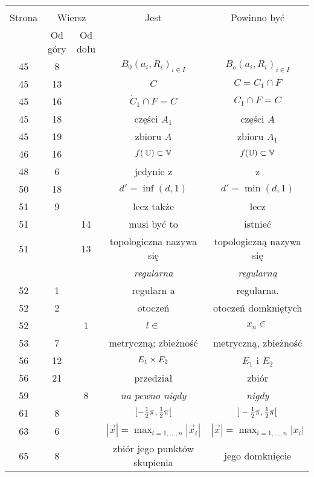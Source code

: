 \documentclass[a4paper,11pt]{article}
\newcommand{\V}{\mb{V}}
\newcommand{\U}{\mb{U}}
\begin{document}
\begin{center}
  \begin{tabular}{|c|c|c|c|c|}
    \hline
    & \multicolumn{2}{c|}{} & & \\
    Strona & \multicolumn{2}{c|}{Wiersz} & Jest
                              & Powinno być \\ \cline{2-3}
    & Od góry & Od dołu & & \\
    \hline
    45  &  8 & & $B_{ 0 }( a_{ i }, R_{ i } )_{ i \in I }$
           & $B_{ o }( a_{ i }, R_{ i } )_{ i \in I }$ \\
    45  & 13 & & $C$ & $C = C_{ 1 } \cap F$ \\
    45  & 16 & & $\dot{ C }_{ 1 } \cap F = C$ & $C_{ 1 } \cap F = C$ \\
    45  & 18 & & części $A_{ 1 }$ & części $A$ \\
    45  & 19 & & zbioru $A$ & zbioru $A_{ 1 }$ \\
    46  & 16 & & $f( \: \U ) \subset \V$ & $f( \U ) \subset \V$ \\
    48  &  6 & & jedynie z & z \\
    50  & 18 & & $d' = \inf( d, 1 )$ & $d' = \min( d, 1 )$ \\
    51  &  9 & & lecz także & lecz \\
    51  & & 14 & musi być to & istnieć \\
    51  & & 13 & topologiczna nazywa się & topologiczną nazywa się \\
    & & & \emph{regularna} & \emph{regularną} \\  %
    52  &  1 & & regularn a & regularna. \\
    52  &  2 & & otoczeń & otoczeń domkniętych \\
    52  & &  1 & $l \in$ & $x_{ n } \in$ \\
    53  &  7 & & metryczną; zbieżność & metryczną, zbieżność \\
    56  & 12 & & $E_{ 1 } \times E_{ 2 }$ & $E_{ 1 }$ i $E_{ 2 }$ \\
    56  & 21 & & przedział & zbiór \\
    59  & &  8 & \emph{na pewno nigdy} & \emph{nigdy} \\
    61  &  8 & & $[ -\frac{ 1 }{ 2 } \pi, \frac{ 1 }{ 2 } \pi [$
           & $] -\frac{ 1 }{ 2 } \pi, \frac{ 1 }{ 2 } \pi [$ \\
    63  &  6 & & $| \vec{ x } | = \max_{ i = 1, \ldots, n}
                 | \vec{ x }_{ i } |$
           & $| \vec{ x } | = \max_{ i = 1, \ldots, n} | x_{ i } |$ \\
    65  &  8 & & zbiór jego punktów skupienia & jego domknięcie \\

\end{tabular}
\end{center}
\end{document}
